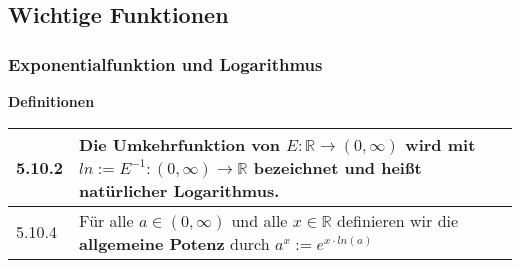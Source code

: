 \begin{table}[H]
\begin{tabularx}{\textwidth}{X m{16cm}}
        \bottomrule
    \end{tabularx}
    \end{table}

\subsection{Wichtige Funktionen}
\subsubsection{Exponentialfunktion und Logarithmus}
    \noindent
    \textbf{Definitionen}
    \begin{table}[H]  
    \begin{tabularx}{\textwidth}{X m{16cm}}
        \toprule

        5.10.2& Die Umkehrfunktion von $E: \mathbb{R} \rightarrow (0, \infty)$ wird mit $ln := E^{-1}: (0,\infty) \rightarrow \mathbb{R}$
                bezeichnet und heißt \textbf{natürlicher Logarithmus}. \\
        \midrule
        5.10.4& Für alle $a \in (0, \infty)$ und alle $x \in \mathbb{R}$ definieren wir die \textbf{allgemeine Potenz} durch $a^x := e^{x\cdot ln(a)}$ \\   

        \bottomrule

    \end{tabularx}
    \end{table}


